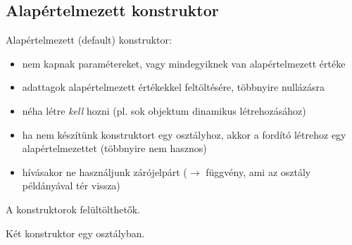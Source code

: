 \documentclass[usenames,dvipsnames,aspectratio=169]{beamer}
\begin{document}
\begin{frame}
    \begin{exampleblock}{}
        \footnotesize
        
    \end{exampleblock}
\end{frame}

\subsection{Alapértelmezett konstruktor}

\begin{frame}
    Alapértelmezett (default) konstruktor:
    \begin{itemize}
        \item nem kapnak paramétereket, vagy mindegyiknek van alapértelmezett értéke
        \item adattagok alapértelmezett értékekkel feltöltésére, többnyire nullázásra
        \item néha létre \emph{kell} hozni (pl. sok objektum dinamikus létrehozásához)
        \item ha nem készítünk konstruktort egy osztályhoz, akkor a fordító létrehoz egy alapértelmezettet (többnyire nem hasznos)
        \item hívásakor ne használjunk zárójelpárt ($\to$ függvény, ami az osztály példányával tér vissza)
    \end{itemize}
    A konstruktorok felültölthetők.
\end{frame}

\begin{frame}
    Két konstruktor egy osztályban.
    \begin{exampleblock}{}
        
    \end{exampleblock}
\end{frame}

\begin{frame}
    \begin{exampleblock}{}
        
    \end{exampleblock}
\end{frame}
\end{document}
